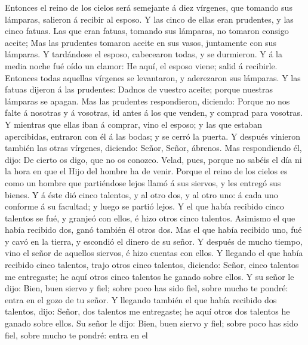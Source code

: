  Entonces el reino de los cielos será semejante á diez
vírgenes, que tomando sus lámparas, salieron á recibir al esposo.
 Y las cinco de ellas eran prudentes, y las cinco fatuas.
 Las que eran fatuas, tomando sus lámparas, no tomaron
consigo aceite;  Mas las prudentes tomaron aceite en sus
vasos, juntamente con sus lámparas.  Y tardándose el
esposo, cabecearon todas, y se durmieron.  Y á la media
noche fué oído un clamor: He aquí, el esposo viene; salid á recibirle.
 Entonces todas aquellas vírgenes se levantaron, y
aderezaron sus lámparas.  Y las fatuas dijeron á las
prudentes: Dadnos de vuestro aceite; porque nuestras lámparas se apagan.
 Mas las prudentes respondieron, diciendo: Porque no nos
falte á nosotras y á vosotras, id antes á los que venden, y comprad para
vosotras.  Y mientras que ellas iban á comprar, vino el
esposo; y las que estaban apercibidas, entraron con él á las bodas; y se
cerró la puerta.  Y después vinieron también las otras
vírgenes, diciendo: Señor, Señor, ábrenos.  Mas
respondiendo él, dijo: De cierto os digo, que no os conozco.
 Velad, pues, porque no sabéis el día ni la hora en que
el Hijo del hombre ha de venir.  Porque el reino de los
cielos es como un hombre que partiéndose lejos llamó á sus siervos, y
les entregó sus bienes.  Y á éste dió cinco talentos, y
al otro dos, y al otro uno: á cada uno conforme á su facultad; y luego
se partió lejos.  Y el que había recibido cinco talentos
se fué, y granjeó con ellos, é hizo otros cinco talentos.
 Asimismo el que había recibido dos, ganó también él
otros dos.  Mas el que había recibido uno, fué y cavó en
la tierra, y escondió el dinero de su señor.  Y después
de mucho tiempo, vino el señor de aquellos siervos, é hizo cuentas con
ellos.  Y llegando el que había recibido cinco talentos,
trajo otros cinco talentos, diciendo: Señor, cinco talentos me
entregaste; he aquí otros cinco talentos he ganado sobre ellos.
 Y su señor le dijo: Bien, buen siervo y fiel; sobre poco
has sido fiel, sobre mucho te pondré: entra en el gozo de tu señor.
 Y llegando también el que había recibido dos talentos,
dijo: Señor, dos talentos me entregaste; he aquí otros dos talentos he
ganado sobre ellos.  Su señor le dijo: Bien, buen siervo
y fiel; sobre poco has sido fiel, sobre mucho te pondré: entra en el
